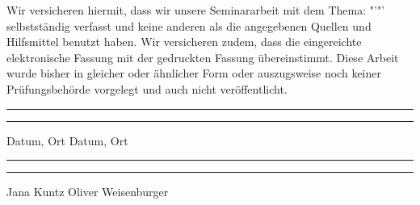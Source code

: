Wir versicheren hiermit, dass wir unsere Seminararbeit mit dem Thema: "'\ThesisTitle"' selbstständig verfasst und keine anderen als die angegebenen Quellen und Hilfsmittel benutzt haben. Wir versicheren zudem, dass die eingereichte elektronische Fassung mit der
gedruckten Fassung übereinstimmt.
Diese Arbeit wurde bisher in gleicher oder ähnlicher Form oder auszugsweise
noch keiner Prüfungsbehörde vorgelegt und auch nicht veröffentlicht.

\vspace{50pt} 
\noindent\rule{5cm}{.4pt}\hfill\rule{5cm}{.4pt}\par 
\noindent Datum, Ort  \hspace{7,4cm} Datum, Ort 
\par
\vspace{2cm}
\par
\noindent\rule{5cm}{.4pt}\hfill\rule{5cm}{.4pt}\par 
\noindent Jana Kuntz \hspace{7,4cm} Oliver Weisenburger
